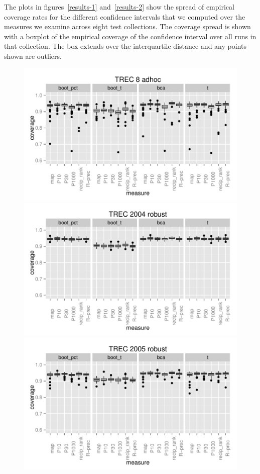 \documentclass{sig-alt-release-2013}
\begin{document}
The plots in figures~\ref{results-1} and~\ref{results-2} show the spread of empirical coverage rates for the different confidence intervals that we computed over the measures we examine across eight test collections.  The coverage spread is shown with a boxplot of the empirical coverage of the confidence interval over all runs in that collection.  The box extends over the interquartile distance and any points shown are outliers.

\begin{figure}
\includegraphics[width=\linewidth]{trec8-adhoc}
\includegraphics[width=\linewidth]{trec13-robust}
\includegraphics[width=\linewidth]{trec14-robust}

\end{figure}
\end{document}
